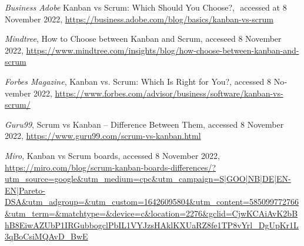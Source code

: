 \begin{latin}
	\begingroup
	\renewcommand{\section}[2]{}%
	
\begin{thebibliography}{9}

	 ‌\textit{Business Adobe}
	Kanban vs Scrum: Which Should You Choose?,  ‌
	accessed at 8 November 2022,
	\url{https://business.adobe.com/blog/basics/kanban-vs-scrum} 

	\textit{Mindtree},
	How to Choose between Kanban and Scrum, 
	acceseed 8 November 2022,
	\url{https://www.mindtree.com/insights/blog/how-choose-between-kanban-and-scrum}

	\textit{Forbes Magazine},
	Kanban vs. Scrum: Which Is Right for You?,
	accessed 8 November 2022,
	\url{https://www.forbes.com/advisor/business/software/kanban-vs-scrum/}
        
	\textit{Guru99},
	Scrum vs Kanban – Difference Between Them,
	accessed 8 November 2022,
	\url{https://www.guru99.com/scrum-vs-kanban.html}

	\textit{Miro},
	Kanban vs Scrum boards,
	accessed 8 November 2022,
	\url{https://miro.com/blog/scrum-kanban-boards-differences/?utm_source=google&utm_medium=cpc&utm_campaign=S|GOO|NB|DE|EN-EN|Pareto-DSA&utm_adgroup=&utm_custom=16426095804&utm_content=585099772766&utm_term=&matchtype=&device=c&location=2276&gclid=CjwKCAiAvK2bBhB8EiwAZUbP1IRGubbogclPbIL1VYJzsHAklKXUaRZ8fe1TP8vYrl_DgUpKr1L3qBoCsiMQAvD_BwE}
        
	
\end{thebibliography}
\endgroup
\end{latin}






